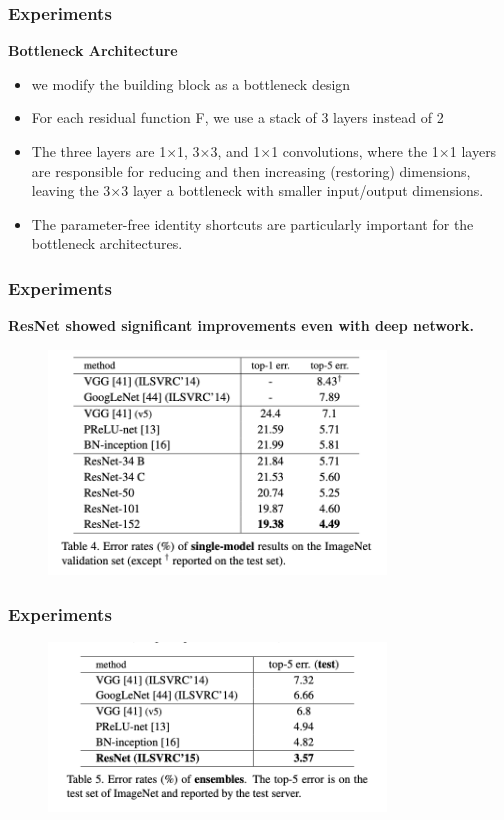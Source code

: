 \documentclass[
	11pt, %
]{beamer}
\begin{document}
\begin{frame}
	\frametitle{Experiments}

	\textbf{Bottleneck Architecture}

	\begin{itemize}
		\item we modify the building block as a bottleneck design
		\item For each residual function F, we use a stack of 3 layers instead of 2
		\item The three layers are 1×1, 3×3, and 1×1 convolutions, where the 1×1 layers are responsible for reducing and then increasing (restoring) dimensions, leaving the 3×3 layer a bottleneck with smaller input/output dimensions.
		\item The parameter-free identity shortcuts are particularly important for the bottleneck architectures.
	\end{itemize}
\end{frame}

\begin{frame}
	\frametitle{Experiments}

	\textbf{ResNet showed significant improvements even with deep network.}

	\begin{figure}
		\centering
		\includegraphics[width=0.8\textwidth]{./images/Screenshot 2025-05-20 at 0.34.11.png}
	\end{figure}
\end{frame}

\begin{frame}
	\frametitle{Experiments}

	\begin{figure}
		\centering
		\includegraphics[width=0.8\textwidth]{./images/Screenshot 2025-05-20 at 0.34.30.png}
	\end{figure}
\end{frame}
\end{document}
